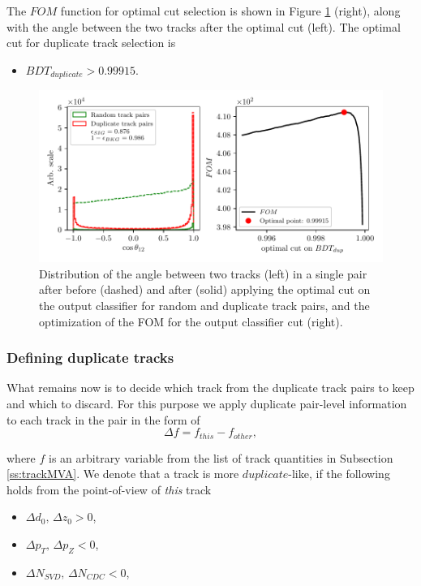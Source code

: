 \documentclass[oneside,a4paper,openany,12pt]{scrbook}
\begin{document}
The $FOM$ function for optimal cut selection is shown in Figure \ref{fig:ROE_dupOpt} (right), along with the angle between the two tracks after the optimal cut (left). The optimal cut for duplicate track selection is
\begin{itemize}
\item $BDT_{duplicate} > 0.99915.$
\end{itemize}

\begin{figure}[H]
\centering
\captionsetup{width=0.8\linewidth}
\includegraphics[width=\linewidth]{fig/ROECleanup_dup_opt}
\caption{Distribution of the angle between two tracks (left) in a single pair after before (dashed) and after (solid) applying the optimal cut on the output classifier for random and duplicate track pairs, and the optimization of the FOM for the output classifier cut (right).}
\label{fig:ROE_dupOpt}
\end{figure}

\subsubsection{Defining duplicate tracks}

What remains now is to decide which track from the duplicate track pairs to keep and which to discard. For this purpose we apply duplicate pair-level information to each track in the pair in the form of
\begin{equation}
\Delta f = f_{this} - f_{other},
\end{equation}

where $f$ is an arbitrary variable from the list of track quantities in Subsection \ref{ss:trackMVA}. We denote that a track is more $duplicate$-like, if the following holds from the point-of-view of \textit{this} track
\begin{itemize}
\item $\Delta d_0,\,\Delta z_0 > 0$,
\item $\Delta p_T,\,\Delta p_Z < 0$,
\item $\Delta N_{SVD},\,\Delta N_{CDC} < 0$,
\end{itemize}
\end{document}
